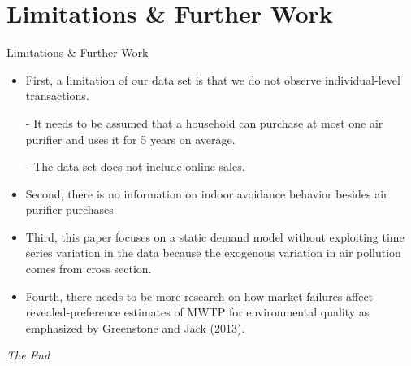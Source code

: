\documentclass{beamer}
\begin{document}
\section{Limitations \& Further Work}
\begin{frame}[shrink]
	\transfade %
	\tableofcontents[sectionstyle=show/shaded,subsectionstyle=show/shaded/hide]
	\addtocounter{framenumber}{-1}
\end{frame}
\begin{frame}{Limitations \& Further Work}
	\begin{itemize}
		\item First, a limitation of our data set is that we do not observe individual-level transactions.
		\item [-] It needs to be assumed that a household can purchase at most one air purifier and uses it for 5 years on average.
		\item [-] The data set does not include online sales.
		\item Second, there is no information on indoor avoidance behavior besides air purifier purchases.
		\item Third, this paper focuses on a static demand model without exploiting time series variation in the data because the exogenous variation in air pollution comes from cross section.
		\item Fourth, there needs to be more research on how market failures affect revealed-preference estimates of MWTP for environmental quality as emphasized by Greenstone and Jack (2013).

	\end{itemize}
\end{frame}


\begin{frame}
\Huge{\centerline{\textit{The End}}}
\end{frame}
\end{document}
